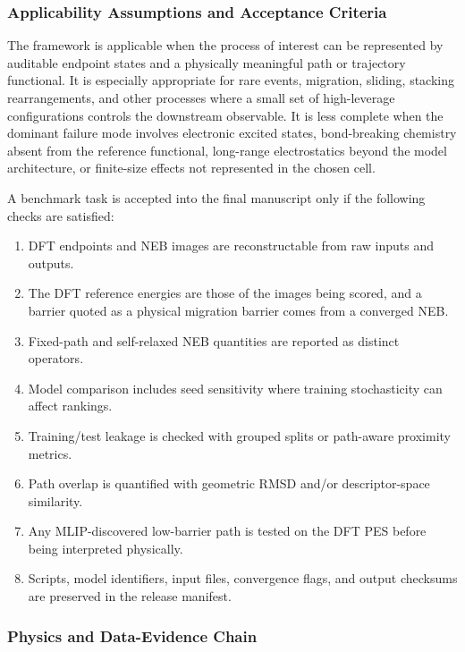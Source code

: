 \subsubsection{Applicability Assumptions and Acceptance Criteria}
\label{sec:acceptance_formal}

The framework is applicable when the process of interest can be represented by auditable endpoint states and a physically meaningful path or trajectory functional. It is especially appropriate for rare events, migration, sliding, stacking rearrangements, and other processes where a small set of high-leverage configurations controls the downstream observable. It is less complete when the dominant failure mode involves electronic excited states, bond-breaking chemistry absent from the reference functional, long-range electrostatics beyond the model architecture, or finite-size effects not represented in the chosen cell.

A benchmark task is accepted into the final manuscript only if the following checks are satisfied:
\begin{enumerate}
    \item DFT endpoints and NEB images are reconstructable from raw inputs and outputs.
    \item The DFT reference energies are those of the images being scored, and a barrier quoted as a physical migration barrier comes from a converged NEB.
    \item Fixed-path and self-relaxed NEB quantities are reported as distinct operators.
    \item Model comparison includes seed sensitivity where training stochasticity can affect rankings.
    \item Training/test leakage is checked with grouped splits or path-aware proximity metrics.
    \item Path overlap is quantified with geometric RMSD and/or descriptor-space similarity.
    \item Any MLIP-discovered low-barrier path is tested on the DFT PES before being interpreted physically.
    \item Scripts, model identifiers, input files, convergence flags, and output checksums are preserved in the release manifest.
\end{enumerate}

\subsubsection{Physics and Data-Evidence Chain}
\label{sec:evidence_chain_formal}

